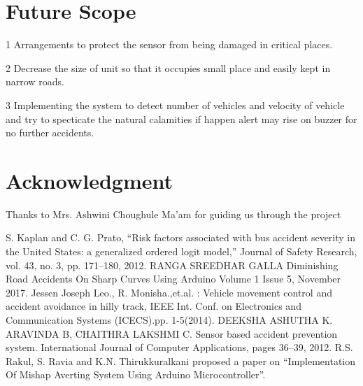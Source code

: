 \documentclass[conference]{IEEEtran}
\begin{document}
    \section{Future Scope}
    \itemize
    \item[1] Arrangements to protect the sensor from being damaged in critical places.
    \item[2] Decrease the size of unit so that it occupies small place and easily kept in narrow roads.
    \item[3] Implementing the system to detect number of vehicles and velocity of vehicle and try to specticate the natural calamities if
    happen alert may rise on buzzer for no further accidents.
    \section*{Acknowledgment}

    Thanks to Mrs. Ashwini Choughule Ma'am for guiding us through the project


    \begin{thebibliography}{00}
         S. Kaplan and C. G. Prato, “Risk factors associated with bus accident severity in the United States: a generalized ordered logit model,” Journal of Safety
        Research, vol. 43, no. 3, pp. 171–180, 2012.
         RANGA SREEDHAR GALLA Diminishing Road Accidents On Sharp Curves Using Arduino Volume 1 Issue 5, November 2017.
         Jessen Joseph Leo., R. Monisha.,et.al. : Vehicle movement control and accident avoidance in hilly track, IEEE Int. Conf. on Electronics and Communication
        Systems (ICECS).pp. 1-5(2014).
         DEEKSHA ASHUTHA K. ARAVINDA B, CHAITHRA LAKSHMI C. Sensor based accident prevention system. International Journal of Computer
        Applications, pages 36–39, 2012.
         R.S. Rakul, S. Ravia and K.N. Thirukkuralkani proposed a paper on “Implementation Of
        Mishap Averting System Using Arduino Microcontroller”.
        \end{thebibliography}
\end{document}
